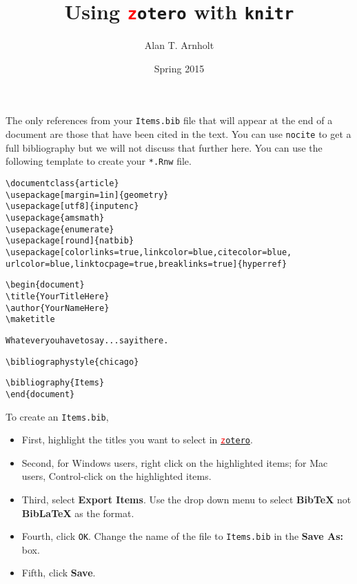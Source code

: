 \documentclass{article}\usepackage[]{graphicx}\usepackage[]{color}
\makeatletter
\newenvironment{kframe}{%
 \def\at@end@of@kframe{}%
 \ifinner\ifhmode%
  \def\at@end@of@kframe{\end{minipage}}%
  \begin{minipage}{\columnwidth}%
 \fi\fi%
 \def\FrameCommand##1{\hskip\@totalleftmargin \hskip-\fboxsep
 \colorbox{shadecolor}{##1}\hskip-\fboxsep
     \hskip-\linewidth \hskip-\@totalleftmargin \hskip\columnwidth}%
 \MakeFramed {\advance\hsize-\width
   \@totalleftmargin\z@ \linewidth\hsize
   \@setminipage}}%
 {\par\unskip\endMakeFramed%
 \at@end@of@kframe}
\newenvironment{knitrout}{}{} %
\makeatother
\begin{document}
\title{Using \texttt{\textcolor{red}{z}otero} with \texttt{knitr}}
\author{Alan T. Arnholt}
\date{Spring 2015}
\maketitle




The only references from your \verb|Items.bib| file that will appear at the end of a document are those that have been cited in the text.  You can use \verb|nocite| to get a full bibliography but we will not discuss that further here.  You can use the following template to create your \verb|*.Rnw| file.
\begin{knitrout}
\color{fgcolor}\begin{kframe}
\begin{alltt}
\textbackslash{}documentclass\{article\}
\textbackslash{}usepackage[margin=1in]\{geometry\}
\textbackslash{}usepackage[utf8]\{inputenc\} 
\textbackslash{}usepackage\{amsmath\}
\textbackslash{}usepackage\{enumerate\}
\textbackslash{}usepackage[round]\{natbib\}
\textbackslash{}usepackage[colorlinks=true, linkcolor=blue, citecolor=blue, 
            urlcolor=blue, linktocpage=true, breaklinks=true]\{hyperref\}


\textbackslash{}begin\{document\}
\textbackslash{}title\{Your Title Here\}
\textbackslash{}author\{Your Name Here\}
\textbackslash{}maketitle

Whatever you have to say...say it here.

\textbackslash{}bibliographystyle\{chicago\}

\textbackslash{}bibliography\{Items\}
\textbackslash{}end\{document\}
\end{alltt}
\end{kframe}
\end{knitrout}

\noindent
To create an \verb|Items.bib|, 

\begin{itemize}
\item First, highlight the titles you want to select in \href{https://www.zotero.org}{\texttt{\textcolor{red}{z}otero}}.  
\item Second, for Windows users, right click on the highlighted items; for Mac users, Control-click on the highlighted items. 
\item Third, select \textbf{Export Items}.  Use the drop down menu to select \textbf{Bib\TeX} not \textbf{Bib\LaTeX} as the format. 
\item Fourth, click \verb|OK|.  Change the name of the file to \verb|Items.bib| in the \textbf{Save As:} box. 
\item Fifth, click \textbf{Save}.
\end{itemize}
\end{document}
